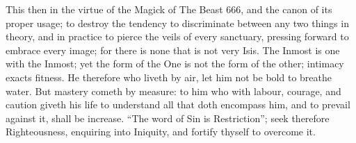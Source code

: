 This then in the virtue of the Magick of The Beast 666, and the canon of its proper usage; to destroy the tendency to discriminate between any two things in theory, and in practice to pierce the veils of every sanctuary, pressing forward to embrace every image; for there is none that is not very Isis. The Inmost is one with the Inmost; yet the form of the One is not the form of the other; intimacy exacts fitness. He therefore who liveth by air, let him not be bold to breathe water. But mastery cometh by measure: to him who with labour, courage, and caution giveth his life to understand all that doth encompass him, and to prevail against it, shall be increase. \enquote{The word of Sin is Restriction}; seek therefore Righteousness, enquiring into Iniquity, and fortify thyself to overcome it.
